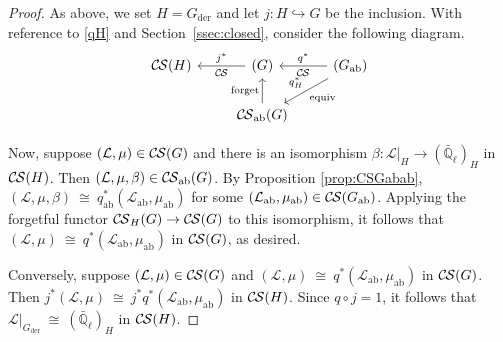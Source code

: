 \documentclass[10pt]{amsart}
\theoremstyle{plain}
\theoremstyle{definition}
\newcommand{\EE}{\mathbb{\bar Q}_\ell}
\newcommand{\der}{_{\operatorname{der}}}
\newcommand{\ab}{_{\operatorname{ab}}}
\newcommand{\iso}{{\ \cong\ }}
\newcommand{\cs}[1]{{\mathcal{#1}}}
\newcommand{\CS}{{\mathcal{C\hskip-0.8pt S}}}
\newcommand{\CSab}{\CS_{\operatorname{ab}}}
\begin{document}
\begin{proof}
As above, we set $H=G\der$
and let $j : H\hookrightarrow G$ be the inclusion. 
With reference to \eqref{qH} and Section~\ref{ssec:closed}, consider the following diagram.
\[
\begin{tikzcd}
\CS(H) & \arrow{l}[swap]{j^*} \CS(G) &\arrow{l}[swap]{q^*} 
\CS(G\ab) \arrow{dl}{\text{equiv}}[swap]{q_{H}^*} \\
& \CSab(G) \arrow{u}{\text{forget}}  & 
\end{tikzcd}
\]

Now, suppose $(\cs{L},\mu)\in \CS(G)$ and there is an isomorphism $\beta : \cs{L}\vert_{H} \to (\EE)_{H}$ in $\CS(H)$.
Then $(\cs{L},\mu,\beta) \in \CSab(G)$.
By Proposition \ref{prop:CSGabab}, $(\cs{L},\mu,\beta) \iso q\ab^*(\cs{L}\ab,\mu\ab)$ for some $(\cs{L}\ab,\mu\ab)\in \CS(G\ab)$.
Applying the forgetful functor $\CS_H(G)\to \CS(G)$ to this isomorphism, it follows that $(\cs{L},\mu) \iso q^*(\cs{L}\ab,\mu\ab)$ in $\CS(G)$, as desired. 

Conversely, suppose $(\cs{L},\mu)\in \CS(G)$ and $(\cs{L},\mu) \iso q^*(\cs{L}\ab,\mu\ab)$ in $\CS(G)$.
Then $j^*(\cs{L},\mu) \iso j^*q^*(\cs{L}\ab,\mu\ab)$ in $\CS(H)$. 
Since $q\circ j = 1$, it follows that $\cs{L}\vert_{G\der} \iso (\EE)_{H}$ in $\CS(H)$.
\end{proof}
\end{document}
